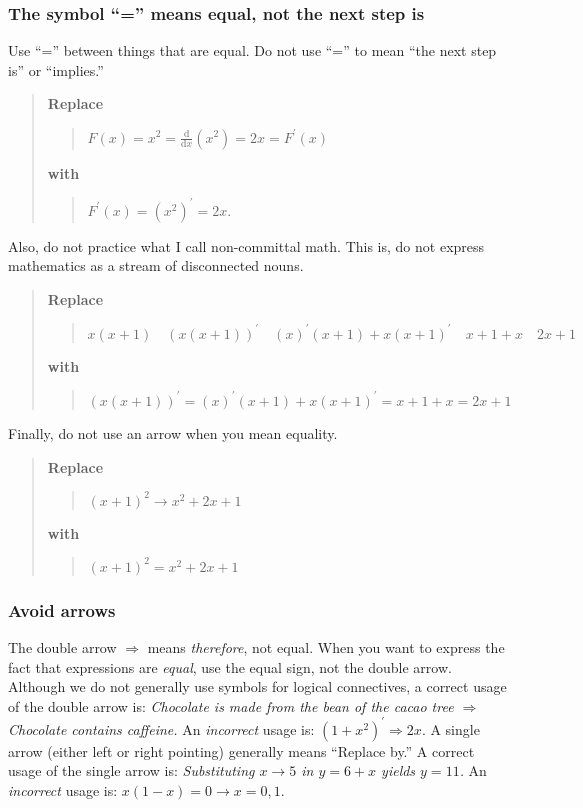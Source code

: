\documentclass[12pt]{article}
\newcounter{ex}\setcounter{ex}{0}
\newcounter{id}\setcounter{id}{0}
\newcounter{se}\setcounter{se}{0}
\begin{document}
 \subsubsection{ The symbol ``='' means equal, not the next step is}

Use ``='' between things that are equal. Do not use ``='' to  mean ``the next step is'' or ``implies.''

\begin{quote}
\textbf{Replace}
\begin{quote}
  \(\displaystyle F(x) = x^2 = \frac{\mathrm{d}}{\mathrm{d} x} (x^2) = 2x = F^\prime(x)\)
\end{quote}
\textbf{with}
\begin{quote}
  \(F^\prime(x) = (x^2)^\prime = 2 x. \)
\end{quote}
\end{quote}

\noindent Also, do not practice what I call non-committal math. This is, do not
express mathematics as a stream of disconnected nouns.

\begin{quote}
\textbf{Replace}
\begin{quote}
  \( x (x + 1) \quad (x (x + 1))^\prime \quad (x)^\prime (x + 1) + x (x+1)^\prime
 \quad x + 1 + x \quad 2x + 1 \)
\end{quote}
\textbf{with}
\begin{quote}
   \((x (x + 1))^\prime = (x)^\prime (x + 1) + x (x+1)^\prime =  x + 1 + x = 2x + 1 \)
\end{quote}
\end{quote}

Finally, do not use an arrow when you mean equality.

\begin{quote}
\textbf{Replace}
\begin{quote}
  \( (x+1)^2 \rightarrow x^2 + 2 x + 1 \)
\end{quote}
\textbf{with}
\begin{quote}
   \( (x+1)^2 = x^2 + 2 x + 1 \)
\end{quote}
\end{quote}

 \subsubsection{ Avoid arrows}
The double arrow \(\Rightarrow\) means \emph{therefore}, not
equal. When you want to express the fact that expressions are
\emph{equal}, use the equal sign, not the double arrow. Although we do
not generally use symbols for logical connectives, a correct usage of
the double arrow is: \emph{Chocolate is made from the bean of the
cacao tree \(\Rightarrow\) Chocolate contains caffeine.}  An
\emph{incorrect} usage is: \(\left(1 + x^2\right)^\prime \Rightarrow 2
x\).  A single arrow (either left or right pointing) generally means
``Replace by.''  A correct usage of the single arrow is:
\emph{Substituting \(x \to 5\) in \(y = 6 + x\) yields \(y = 11\).} An
\emph{incorrect} usage is: \(x (1-x) = 0 \to x = 0,1\).
\end{document}
